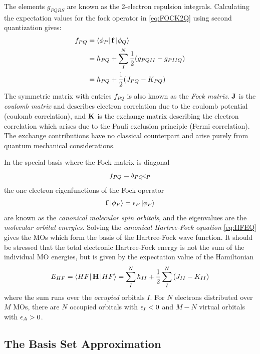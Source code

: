 \noindent The elements $g_{PQRS}$ are known as the 2-electron repulsion integrals. Calculating the expectation values for the fock operator in \ref{eq:FOCK2Q} using second quantization gives:
\begin{equation}
\begin{split}
f_{PQ} &= \bra{\phi_P} \mathbf{f} \ket{\phi_Q} \\
	&= h_{PQ} + \sum_{I}^N \frac{1}{2} (g_{PQII} - g_{PIIQ}) \\
	&= h_{PQ} + \frac{1}{2} (J_{PQ} - K_{PQ})
\end{split}
\end{equation} 
\noindent The symmetric matrix with entries $f_{PQ}$ is also known as the \emph{Fock matrix}. $\mathbf{J}$ is the \emph{coulomb matrix} and describes electron correlation due to the coulomb potential (coulomb correlation), and $\mathbf{K}$ is the exchange matrix describing the electron correlation which arises due to the Pauli exclusion principle (Fermi correlation). The exchange contributions have no classical counterpart and arise purely from quantum mechanical considerations. 

In the special basis where the Fock matrix is diagonal
\begin{equation}
f_{PQ} = \delta_{PQ} \epsilon_P 
\end{equation}
\noindent the one-electron eigenfunctions of the Fock operator 
\begin{equation}
\mathbf{f} \ket{\phi_P} = \epsilon_P \ket{\phi_P} 
\label{eq:HFEQ}
\end{equation} 
\noindent are known as the \emph{canonical molecular spin orbitals}, and the eigenvalues are the \emph{molecular orbital energies}. Solving the \emph{canonical Hartree-Fock equation} \ref{eq:HFEQ} gives the MOs which form the basis of the Hartree-Fock wave function. It should be stressed that the total electronic Hartree-Fock energy is not the sum of the individual MO energies, but is given by the expectation value of the Hamiltonian 
\begin{equation}
E_{HF} = \bra{HF}\mathbf{H}\ket{HF} = \sum_{I}^{N} h_{II} + \frac{1}{2} \sum_{I}^{N} \left( J_{II} - K_{II} \right)   
\end{equation}
\noindent where the sum runs over the \emph{occupied} orbitals $I$. For $N$ electrons distributed over $M$ MOs, there are $N$ occupied orbitals with $\epsilon_I < 0$ and $M-N$ virtual orbitals with $\epsilon_A > 0$. 

\subsection{The Basis Set Approximation}

